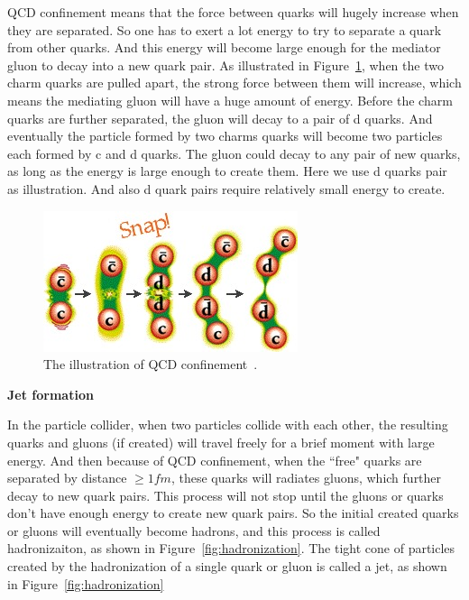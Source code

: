 QCD confinement means that the force between quarks will hugely increase when they are separated. 
So one has to exert a lot energy to try to separate a quark from other quarks. And this energy will
become large enough for the mediator gluon to decay into a new quark pair. 
As illustrated in Figure~\ref{fig:color_field},  when the two charm quarks are pulled apart, the 
strong force between them will increase, which means the mediating gluon will have 
a huge amount of energy. Before the charm quarks are further separated, the gluon will 
decay to a pair of d quarks. And eventually the particle formed by two charms quarks will become 
two particles each formed by c and d quarks. The gluon could decay to any pair of new quarks, 
as long as the energy is large enough to create them. Here we use d quarks pair as illustration. 
And also d quark pairs require relatively small energy to create. 

\begin{figure}[htb]
\centering
\includegraphics[width=.7\textwidth]{figures/color_field.jpg}
\caption{The illustration of QCD confinement~\cite{web:qcd_confinement}.}
\label{fig:color_field}
\end{figure}  



{\bf Jet formation}

In the particle collider, when two particles collide with each other, the resulting quarks and 
gluons (if created) will travel freely for a brief moment with large energy. And then because of 
QCD confinement, when the ``free" quarks are separated by distance ${\geq} 1fm$, 
these quarks will radiates gluons, which further decay to new quark pairs. 
This process will not stop until the gluons or quarks don't have enough energy to 
create new quark pairs. So the initial created quarks or gluons will 
eventually become hadrons, and this process is called hadronizaiton, as shown
in Figure~\ref{fig:hadronization}. 
The tight cone of particles created by 
the hadronization of a single quark or gluon is called a jet, as shown in 
Figure~\ref{fig:hadronization}

